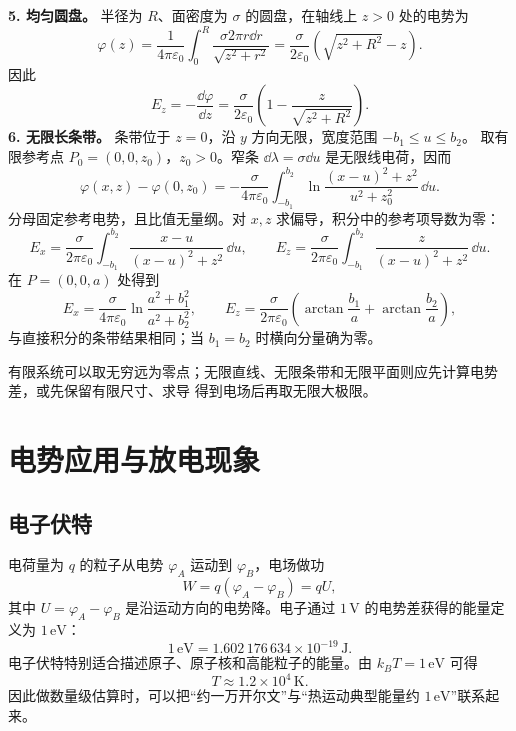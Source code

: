 \begin{xesolution}
\textbf{5. 均匀圆盘。} 半径为 $R$、面密度为 $\sigma$ 的圆盘，在轴线上 $z>0$ 处的电势为
\[
  \varphi(z)=\frac{1}{4\pi\varepsilon_0}
  \int_0^R\frac{\sigma2\pi r\dd r}{\sqrt{z^2+r^2}}
  =\frac{\sigma}{2\varepsilon_0}
  \left(\sqrt{z^2+R^2}-z\right).
\]
因此
\[
  \boxed{E_z=-\frac{\dd\varphi}{\dd z}
  =\frac{\sigma}{2\varepsilon_0}
  \left(1-\frac{z}{\sqrt{z^2+R^2}}\right)}.
\]
\textbf{6. 无限长条带。} 条带位于 $z=0$，沿 $y$ 方向无限，宽度范围 $-b_1\le u\le b_2$。
取有限参考点 $P_0=(0,0,z_0)$，$z_0>0$。窄条 $\dd\lambda=\sigma\dd u$ 是无限线电荷，因而
\[
 \varphi(x,z)-\varphi(0,z_0)
 =-\frac{\sigma}{4\pi\varepsilon_0}\int_{-b_1}^{b_2}
 \ln\frac{(x-u)^2+z^2}{u^2+z_0^2}\,\dd u.
\]
分母固定参考电势，且比值无量纲。对 $x,z$ 求偏导，积分中的参考项导数为零：
\[
 E_x=\frac{\sigma}{2\pi\varepsilon_0}\int_{-b_1}^{b_2}
 \frac{x-u}{(x-u)^2+z^2}\,\dd u,\qquad
 E_z=\frac{\sigma}{2\pi\varepsilon_0}\int_{-b_1}^{b_2}
 \frac{z}{(x-u)^2+z^2}\,\dd u.
\]
在 $P=(0,0,a)$ 处得到
\[
 E_x=\frac{\sigma}{4\pi\varepsilon_0}\ln\frac{a^2+b_1^2}{a^2+b_2^2},\qquad
 E_z=\frac{\sigma}{2\pi\varepsilon_0}\left(\arctan\frac{b_1}{a}+\arctan\frac{b_2}{a}\right),
\]
与直接积分的条带结果相同；当 $b_1=b_2$ 时横向分量确为零。

有限系统可以取无穷远为零点；无限直线、无限条带和无限平面则应先计算电势差，或先保留有限尺寸、求导
得到电场后再取无限大极限。
\end{xesolution}



\section{电势应用与放电现象}

\subsection{电子伏特}


电荷量为 $q$ 的粒子从电势 $\varphi_A$ 运动到 $\varphi_B$，电场做功
\[
  W=q(\varphi_A-\varphi_B)=qU,
\]
其中 $U=\varphi_A-\varphi_B$ 是沿运动方向的电势降。电子通过 $1\,\mathrm V$ 的电势差获得的能量定义为
$1\,\mathrm{eV}$：
\begin{equation}
  \boxed{1\,\mathrm{eV}=1.602\,176\,634\times10^{-19}\,\mathrm J}.
\end{equation}
电子伏特特别适合描述原子、原子核和高能粒子的能量。由 $k_BT=1\,\mathrm{eV}$ 可得
\begin{equation}
  \boxed{T\approx1.2\times10^4\,\mathrm K}.
\end{equation}
因此做数量级估算时，可以把“约一万开尔文”与“热运动典型能量约 $1\,\mathrm{eV}$”联系起来。

